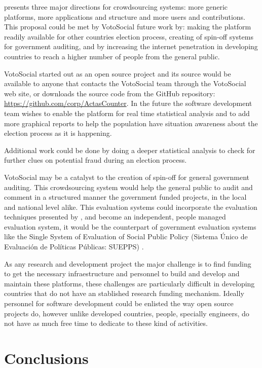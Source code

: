 \documentclass[letterpaper,10pt]{article}
\begin{document}
\cite{doan2011} presents three major directions for crowdsourcing systems: more generic platforms, more applications and structure and more users and contributions. This proposal could be met by VotoSocial future work by: making the platform readily available for other countries election process, creating of spin-off systems for government auditing, and by increasing the internet penetration in developing countries to reach a higher number of people from the general public.

VotoSocial started out as an open source project and its source would be available to anyone that contacts the VotoSocial team through the VotoSocial web site, or downloads the source code from the GitHub repository: \url{https://github.com/corp/ActasCounter}. In the future the software development team wishes to enable the platform for real time statistical analysis and to add more graphical reports to help the population have situation awareness about the election process as it is happening.

Additional work could be done by doing a deeper statistical analysis to check for further clues on potential fraud during an election process.

VotoSocial may be a catalyst to the creation of spin-off for general government auditing. This crowdsourcing system would help the general public to audit and comment in a structured manner the government funded projects, in the local and national level alike. This evaluation systems could incorporate the evaluation techniques presented by \citep{morra2009}, and become an independent, people managed evaluation system, it would be the counterpart of government evaluation systems like the Single System of Evaluation of Social Public Policy (Sistema \'{U}nico de Evaluaci\'{o}n de Pol\'{i}ticas P\'{u}blicas: SUEPPS) \cite{arias2014}.

As any research and development project the major challenge is to find funding to get the necessary infraestructure and personnel to build and develop and maintain these platforms, these challenges are particularly difficult in developing countries that do not have an stablished research funding mechanism. Ideally personnel for software development could be enlisted the way open source projects do, however unlike developed countries, people, specially engineers, do not have as much free time to dedicate to these kind of activities.


\section{Conclusions}
\end{document}
